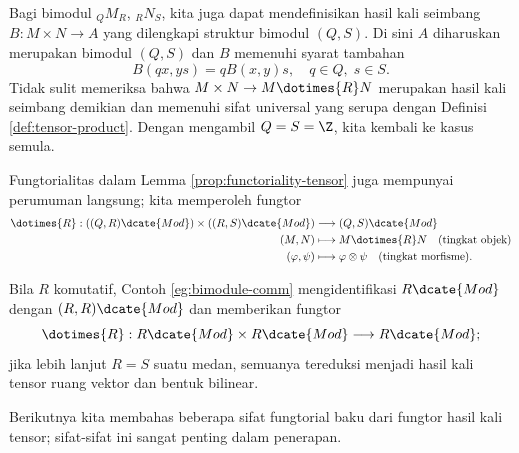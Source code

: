 \begin{remark}\label{rem:bimodule-balanced}
	Bagi bimodul ${}_Q M_R$, ${}_R N_S$, kita juga dapat mendefinisikan hasil kali seimbang $B: M \times N \to A$ yang dilengkapi struktur bimodul $(Q, S)$. Di sini $A$ diharuskan merupakan bimodul $(Q, S)$ dan $B$ memenuhi syarat tambahan
	\[ B(qx, ys) = q B(x, y)s, \quad q \in Q, \; s \in S. \]
	Tidak sulit memeriksa bahwa $M \times N \to M \dotimes{R} N$ merupakan hasil kali seimbang demikian dan memenuhi sifat universal yang serupa dengan Definisi \ref{def:tensor-product}. Dengan mengambil $Q = S = \Z$, kita kembali ke kasus semula.

	Fungtorialitas dalam Lemma \ref{prop:functoriality-tensor} juga mempunyai perumuman langsung; kita memperoleh fungtor
	\begin{align*}
		\dotimes{R} : \left( (Q, R)\dcate{Mod} \right) \times \left( (R, S)\dcate{Mod} \right) & \longrightarrow (Q, S)\dcate{Mod} \\
		(M, N) & \longmapsto M \dotimes{R} N \quad \text{(tingkat objek)} \\
		(\varphi, \psi) & \longmapsto \varphi \otimes \psi \quad \text{(tingkat morfisme)}.
	\end{align*}

	Bila $R$ komutatif, Contoh \ref{eg:bimodule-comm} mengidentifikasi $R\dcate{Mod}$ dengan $(R, R)\dcate{Mod}$ dan memberikan fungtor
	\[ \dotimes{R} : R\dcate{Mod} \times R\dcate{Mod} \longrightarrow R\dcate{Mod}; \]
	jika lebih lanjut $R=S$ suatu medan, semuanya tereduksi menjadi hasil kali tensor ruang vektor dan bentuk bilinear.
\end{remark}

Berikutnya kita membahas beberapa sifat fungtorial baku dari fungtor hasil kali tensor; sifat-sifat ini sangat penting dalam penerapan.

